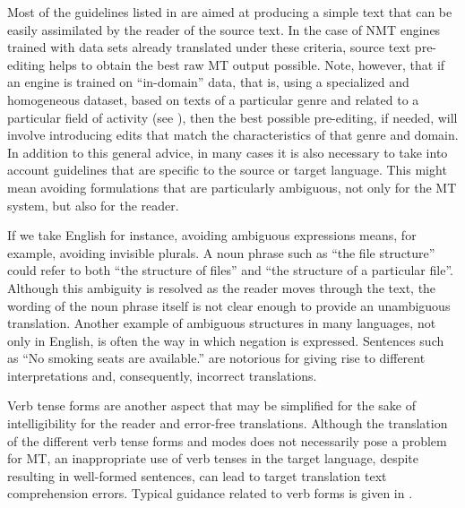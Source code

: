 \documentclass[output=paper,colorlinks,citecolor=brown,
]{langscibook}
\begin{document}
Most of the guidelines listed in  are aimed at producing a simple text that can be easily assimilated by the reader of the source text. In the case of NMT engines trained with data sets already translated under these criteria, source text pre-editing helps to obtain the best raw MT output possible. Note, however, that if an engine is trained on “in-domain” data, that is, using a specialized and homogeneous dataset, based on texts of a particular genre and related to a particular field of activity (see ), then the best possible pre-editing, if needed, will involve introducing edits that match the characteristics of that genre and domain. In addition to this general advice, in many cases it is also necessary to take into account guidelines that are specific to the source or target language. This might mean avoiding formulations that are particularly ambiguous, not only for the MT system, but also for the reader.

If we take English for instance, avoiding ambiguous expressions means, for example, avoiding invisible plurals. A noun phrase such as “the file structure” could refer to both “the structure of files” and “the structure of a particular file”. Although this ambiguity is resolved as the reader moves through the text, the wording of the noun phrase itself is not clear enough to provide an unambiguous translation. Another example of ambiguous structures in many languages, not only in English, is often the way in which negation is expressed. Sentences such as “No smoking seats are available.” are notorious for giving rise to different interpretations and, consequently, incorrect translations.

Verb tense forms are another aspect that may be simplified for the sake of intelligibility for the reader and error-free translations. Although the translation of the different verb tense forms and modes does not necessarily pose a problem for MT, an inappropriate use of verb tenses in the target language, despite resulting in well-formed sentences, can lead to target translation text comprehension errors. Typical guidance related to verb forms is given in .
\end{document}
